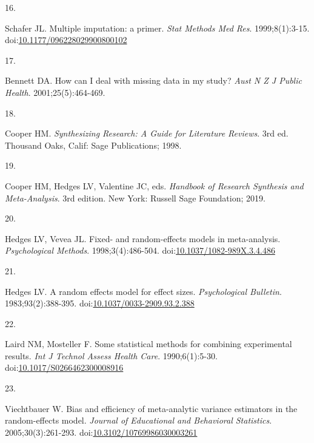 \documentclass[
]{article}
\newlength{\cslhangindent}
\newlength{\csllabelwidth}
\newlength{\cslentryspacingunit} %
\newenvironment{CSLReferences}[2] %
 {%
  \setlength{\parindent}{0pt}
  \ifodd #1
  \let\oldpar\par
  \def\par{\hangindent=\cslhangindent\oldpar}
  \fi
  \setlength{\parskip}{#2\cslentryspacingunit}
 }%
 {}
\newcommand{\CSLLeftMargin}[1]{\parbox[t]{\csllabelwidth}{#1}}
\newcommand{\CSLRightInline}[1]{\parbox[t]{\linewidth - \csllabelwidth}{#1}\break}
\begin{document}
\begin{CSLReferences}{0}{0}
\leavevmode{}%
\CSLLeftMargin{16. }
\CSLRightInline{Schafer JL. Multiple imputation: a primer. \emph{Stat Methods Med Res}. 1999;8(1):3-15. doi:\href{https://doi.org/10.1177/096228029900800102}{10.1177/096228029900800102}}

\leavevmode{}%
\CSLLeftMargin{17. }
\CSLRightInline{Bennett DA. How can I deal with missing data in my study? \emph{Aust N Z J Public Health}. 2001;25(5):464-469.}

\leavevmode{}%
\CSLLeftMargin{18. }
\CSLRightInline{Cooper HM. \emph{Synthesizing Research: A Guide for Literature Reviews}. 3rd ed. Thousand Oaks, Calif: Sage Publications; 1998.}

\leavevmode{}%
\CSLLeftMargin{19. }
\CSLRightInline{Cooper HM, Hedges LV, Valentine JC, eds. \emph{Handbook of Research Synthesis and Meta-Analysis}. 3rd edition. New York: Russell Sage Foundation; 2019.}

\leavevmode{}%
\CSLLeftMargin{20. }
\CSLRightInline{Hedges LV, Vevea JL. Fixed- and random-effects models in meta-analysis. \emph{Psychological Methods}. 1998;3(4):486-504. doi:\href{https://doi.org/10.1037/1082-989X.3.4.486}{10.1037/1082-989X.3.4.486}}

\leavevmode{}%
\CSLLeftMargin{21. }
\CSLRightInline{Hedges LV. A random effects model for effect sizes. \emph{Psychological Bulletin}. 1983;93(2):388-395. doi:\href{https://doi.org/10.1037/0033-2909.93.2.388}{10.1037/0033-2909.93.2.388}}

\leavevmode{}%
\CSLLeftMargin{22. }
\CSLRightInline{Laird NM, Mosteller F. Some statistical methods for combining experimental results. \emph{Int J Technol Assess Health Care}. 1990;6(1):5-30. doi:\href{https://doi.org/10.1017/S0266462300008916}{10.1017/S0266462300008916}}

\leavevmode{}%
\CSLLeftMargin{23. }
\CSLRightInline{Viechtbauer W. Bias and efficiency of meta-analytic variance estimators in the random-effects model. \emph{Journal of Educational and Behavioral Statistics}. 2005;30(3):261-293. doi:\href{https://doi.org/10.3102/10769986030003261}{10.3102/10769986030003261}}


\end{CSLReferences}
\end{document}
